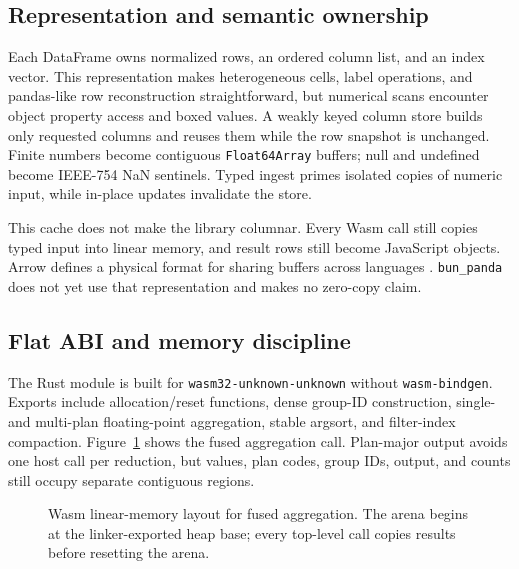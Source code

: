 \documentclass[pdflatex,sn-basic,Numbered]{sn-jnl}
\begin{document}
\subsection{Representation and semantic ownership}

Each DataFrame owns normalized rows, an ordered column list, and an index vector. This representation makes heterogeneous cells, label operations, and pandas-like row reconstruction straightforward, but numerical scans encounter object property access and boxed values. A weakly keyed column store builds only requested columns and reuses them while the row snapshot is unchanged. Finite numbers become contiguous \texttt{Float64Array} buffers; null and undefined become IEEE-754 NaN sentinels. Typed ingest primes isolated copies of numeric input, while in-place updates invalidate the store.

This cache does not make the library columnar. Every Wasm call still copies typed input into linear memory, and result rows still become JavaScript objects. Arrow defines a physical format for sharing buffers across languages \cite{arrowformat,dataframeprotocol}. \texttt{bun\_panda} does not yet use that representation and makes no zero-copy claim.

\subsection{Flat ABI and memory discipline}

The Rust module is built for \texttt{wasm32-unknown-unknown} without \texttt{wasm-bindgen}. Exports include allocation/reset functions, dense group-ID construction, single- and multi-plan floating-point aggregation, stable argsort, and filter-index compaction. Figure~\ref{fig:memory} shows the fused aggregation call. Plan-major output avoids one host call per reduction, but values, plan codes, group IDs, output, and counts still occupy separate contiguous regions.

\begin{figure}[t]
\centering
{}
\caption{Wasm linear-memory layout for fused aggregation. The arena begins at the linker-exported heap base; every top-level call copies results before resetting the arena.}\label{fig:memory}
\end{figure}
\end{document}
